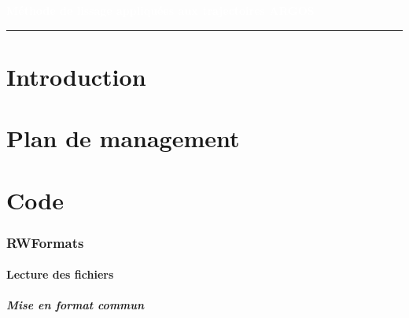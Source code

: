 \documentclass[11p, a4papert]{article}
\author{%
    Anthony Delannoy \\
    \texttt{anthony.delannoy@etu.enseeiht.fr}\vspace{40pt} \\
    Benoit Madiot \\
    \texttt{benoit.madiot@etu.enseeiht.fr}\vspace{40pt} \\
    Jérôme Combaniere \\
    \texttt{jerome.combaniere@etu.enseeiht.fr} 
    }
\makeatletter
\def\printauthor{%
    {\large \@author}}
\makeatother
\begin{document}
\begin{titlepage}
\BgThispage
{}
\vspace*{0.4\textheight}
\noindent
\textcolor{white}{\huge\textbf{\textsf{Méthode de lissage appliquées aux trajectoires ARGOS}}}
\vspace*{3cm}\par
\noindent
\begin{minipage}{0.5\linewidth}
    \begin{flushright}
        \printauthor
    \end{flushright}
\end{minipage} \hspace{15pt}
%
\begin{minipage}{0.02\linewidth}
    \rule{1pt}{175pt}
\end{minipage} \hspace{-10pt}
%
\begin{minipage}{0.63\linewidth}
\vspace{5pt}
    \begin{abstract} 
\lipsum[1]
    \end{abstract}
\end{minipage}
\end{titlepage}
\restoregeometry

\newpage
\thispagestyle{empty}
\tableofcontents
\newpage


\part{Introduction}
\part{Plan de management} %
\part{Code}
\section{RWFormats}
\subsection{Lecture des fichiers}
\subsubsection{Mise en format commun}
\end{document}
